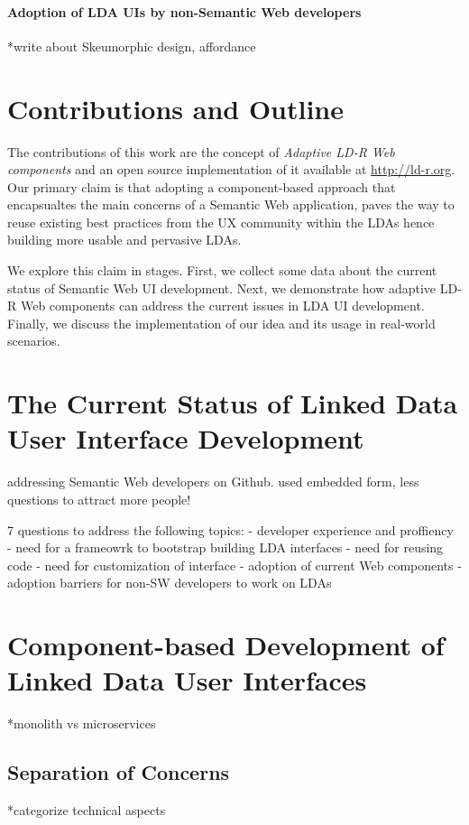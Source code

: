 \documentclass{acm_proc_article-sp}
\begin{document}
\paragraph{Adoption of LDA UIs by non-Semantic Web developers} 
*write about Skeumorphic design, affordance~\cite{Norman2013}

\section{Contributions and Outline}
The contributions of this work are the concept of \emph{Adaptive LD-R Web components} and an open source implementation of it available at \url{http://ld-r.org}.
Our primary claim is that adopting a component-based approach that encapsualtes the main concerns of a Semantic Web application, paves the way to reuse existing best practices from the UX community within the LDAs hence building more usable and pervasive LDAs.

We explore this claim in stages.
First, we collect some data about the current status of Semantic Web UI development.
Next, we demonstrate how adaptive LD-R Web components can address the current issues in LDA UI development.
Finally, we discuss the implementation of our idea and its usage in real-world scenarios.

\section{The Current Status of Linked Data User Interface Development}
addressing Semantic Web developers on Github. used embedded form, less questions to attract more people!

7 questions to address the following topics:
- developer experience and proffiency
- need for a frameowrk to bootstrap building LDA interfaces
- need for reusing code
- need for customization of interface
- adoption of current Web components
- adoption barriers for non-SW developers to work on LDAs


\section{Component-based Development of Linked Data User Interfaces}
*monolith vs microservices

\subsection{Separation of Concerns}
*categorize technical aspects
\end{document}
